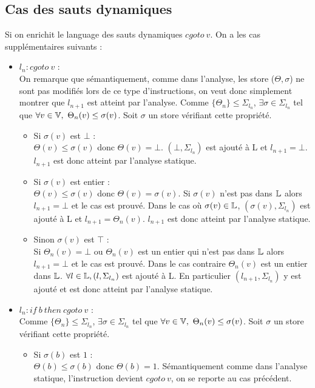 \subsection{Cas des sauts dynamiques}
Si on enrichit le language des sauts dynamiques $cgoto\ v$. On a les cas supplémentaires suivants :
\begin{itemize}
 \item $l_n : cgoto\ v$ :\\ 
 On remarque que sémantiquement, comme dans l'analyse, les store ($\Theta,\sigma$) ne sont pas modifiés lors de ce type d'instructions, on veut donc simplement montrer que $l_{n+1}$ est atteint par l'analyse.
   Comme $\{\Theta_n\}\leq\Sigma_{l_n}$, $\exists\sigma\in\Sigma_{l_n}$ tel que $\forall v\in\BV,\ \Theta_n(v)\leq\sigma(v)$. Soit $\sigma$ un store vérifiant cette propriété.
  \begin{itemize}
   \item Si $\sigma(v)$ est $\bot$ :\\
   $\Theta(v)\leq\sigma(v)$ donc $\Theta(v)=\bot$. $(\bot, \Sigma_{l_n})$ est ajouté à L et $l_{n+1}=\bot$. $l_{n+1}$ est donc atteint par l'analyse statique.
  
   \item Si $\sigma(v)$ est entier :\\
   $\Theta(v)\leq\sigma(v)$ donc $\Theta(v)=\sigma(v)$.
   Si $\sigma(v)$ n'est pas dans $\mathbb L$ alors $l_{n+1}=\bot$ et le cas est prouvé.
   Dans le cas où $\sigma(v)\in\mathbb L$, $(\sigma(v), \Sigma_{l_n})$ est ajouté à L et $l_{n+1}=\Theta_n(v)$. $l_{n+1}$ est donc atteint par l'analyse statique.
  
   \item Sinon $\sigma(v)$ est $\top$ :\\
   Si $\Theta_n(v)=\bot$ ou $\Theta_n(v)$ est un entier qui n'est pas dans $\mathbb L$ alors $l_{n+1}=\bot$ et le cas est prouvé.
   Dans le cas contraire $\Theta_n(v)$ est un entier dans $\mathbb L$. $\forall l\in\mathbb L,(l,\Sigma_{l_n})$ est ajouté à L. En particulier $(l_{n+1},\Sigma_{l_n})$ y est ajouté et est donc atteint par l'analyse statique.
  \end{itemize}
 \item $l_n : if\ b\ then\ cgoto\ v$ :\\
Comme $\{\Theta_n\}\leq\Sigma_{l_n}$, $\exists\sigma\in\Sigma_{l_n}$ tel que $\forall v\in\BV,\ \Theta_n(v)\leq\sigma(v)$. Soit $\sigma$ un store vérifiant cette propriété.
  \begin{itemize}
   \item Si $\sigma(b)$ est $1$ :\\
   $\Theta(b)\leq\sigma(b)$ donc $\Theta(b)=1$. Sémantiquement comme dans l'analyse statique, l'instruction devient $cgoto\ v$, on se reporte au cas précédent.
  

\end{itemize}
\end{itemize}
